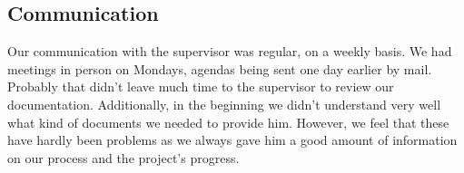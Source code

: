 \subsection{Communication}
Our communication with the supervisor was regular, on a weekly basis.
We had meetings in person on Mondays, agendas being sent one day earlier by mail.
Probably that didn't leave much time to the supervisor to review our documentation.
Additionally, in the beginning we didn't understand very well what kind of documents
we needed to provide him.
However, we feel that these have hardly been problems as we always gave him a
good amount of information on our process and the project's progress.




